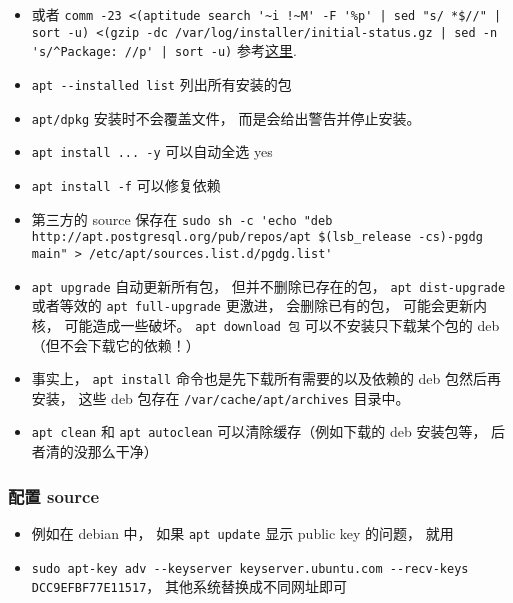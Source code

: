 \begin{itemize}
\item 或者 \verb`comm -23 <(aptitude search '~i !~M' -F '%p' | sed "s/ *$//" | sort -u) <(gzip -dc /var/log/installer/initial-status.gz | sed -n 's/^Package: //p' | sort -u)` 参考\href{https://askubuntu.com/questions/2389/how-to-list-manually-installed-packages}{这里}.
\item \verb`apt --installed list` 列出所有安装的包
\item \verb`apt/dpkg` 安装时不会覆盖文件， 而是会给出警告并停止安装。
\item \verb`apt install ... -y` 可以自动全选 yes
\item \verb`apt install -f` 可以修复依赖
\item 第三方的 source 保存在 \verb`sudo sh -c 'echo "deb http://apt.postgresql.org/pub/repos/apt $(lsb_release -cs)-pgdg main" > /etc/apt/sources.list.d/pgdg.list'`
\item \verb`apt upgrade` 自动更新所有包， 但并不删除已存在的包， \verb`apt dist-upgrade` 或者等效的 \verb`apt full-upgrade` 更激进， 会删除已有的包， 可能会更新内核， 可能造成一些破坏。
\verb`apt download 包` 可以不安装只下载某个包的 deb （但不会下载它的依赖！）
\item 事实上， \verb`apt install` 命令也是先下载所有需要的以及依赖的 deb 包然后再安装， 这些 deb 包存在 \verb`/var/cache/apt/archives` 目录中。
\item \verb`apt clean` 和 \verb`apt autoclean` 可以清除缓存（例如下载的 deb 安装包等， 后者清的没那么干净）
\end{itemize}


\subsubsection{配置 source}
\begin{itemize}
\item 例如在 debian 中， 如果 \verb`apt update` 显示 public key 的问题， 就用
\item \verb`sudo apt-key adv --keyserver keyserver.ubuntu.com --recv-keys DCC9EFBF77E11517`， 其他系统替换成不同网址即可
\end{itemize}

